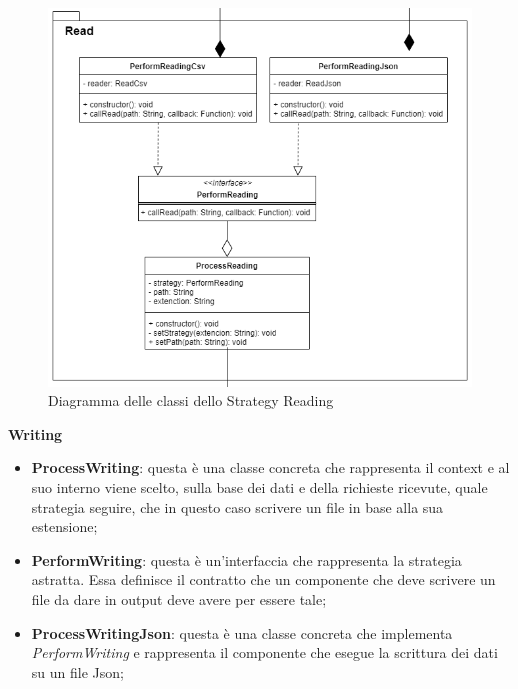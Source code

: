 			\begin{figure} [H]
				\includegraphics[width=\linewidth]{./img/Diagrammi/dAppR.png}
				\caption{Diagramma delle classi dello Strategy Reading}
			\end{figure}
			\textbf{Writing} \mbox{} \\ 
			\begin{itemize}
				\item \textbf{ProcessWriting}: questa è una classe concreta che rappresenta il context e al suo interno viene scelto, sulla base dei dati e della richieste ricevute, quale strategia seguire, che in questo caso scrivere un file in base alla sua estensione;
				\item \textbf{PerformWriting}: questa è un'interfaccia che rappresenta la strategia astratta. Essa definisce il contratto che un componente che deve scrivere un file da dare in output deve avere per essere tale;
				\item \textbf{ProcessWritingJson}: questa è una classe concreta che implementa \textit{PerformWriting} e rappresenta il componente che esegue la scrittura dei dati su un file Json;
			\end{itemize}
			\mbox{}
			
